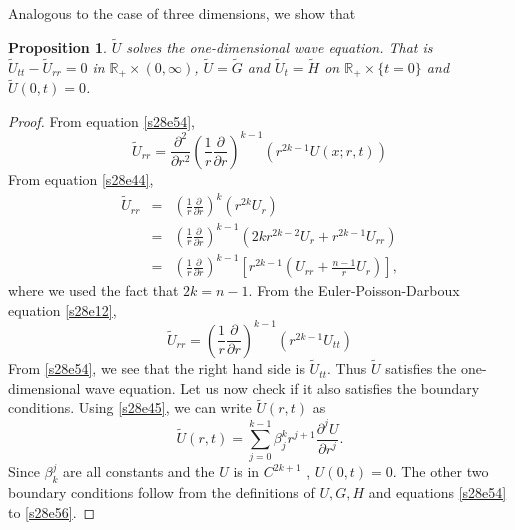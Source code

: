 \documentclass{article}
\theoremstyle{plain}
\numberwithin{thm}{section}
\theoremstyle{plain}
\newtheorem{prop}{Proposition}
\numberwithin{prop}{section}
\theoremstyle{definition}
\numberwithin{defn}{section}
\theoremstyle{remark}
\numberwithin{equation}{section}
\begin{document}
Analogous to the case of three dimensions, we show that
\begin{prop}\label{s28p3}
$\tilde{U}$ solves the one-dimensional wave equation. That is $\tilde{U}_{tt} - \tilde{U}_{rr} = 0$ in 
$\mathbb{R}_+ \times (0, \infty)$, $\tilde{U} = \tilde{G}$ and $\tilde{U}_t = \tilde{H}$ on $\mathbb{R}_+ \times
\{t = 0\}$ and $\tilde{U}(0, t) = 0$.
\end{prop}
\begin{proof}
From equation \eqref{s28e54},
\[
\tilde{U}_{rr} = 
\frac{\partial^2}{\partial r^2}\left(\frac{1}{r}\frac{\partial}{\partial r}\right)^{k-1}(r^{2k-1}U(x; r,t))
\]
From equation \eqref{s28e44},
\begin{eqnarray*}
\tilde{U}_{rr} &=& \left(\frac{1}{r}\frac{\partial}{\partial r}\right)^k\left(r^{2k}U_r\right) \\
 &=& \left(\frac{1}{r}\frac{\partial}{\partial r}\right)^{k-1}\left(2kr^{2k-2}U_r + r^{2k-1}U_{rr}\right) \\
 &=& \left(\frac{1}{r}\frac{\partial}{\partial r}\right)^{k-1}\left[r^{2k-1}\left(U_{rr} + 
 \frac{n-1}{r}U_r\right)\right],
\end{eqnarray*}
where we used the fact that $2k = n - 1$. From the Euler-Poisson-Darboux equation \eqref{s28e12}, 
\[
\tilde{U}_{rr} = \left(\frac{1}{r}\frac{\partial}{\partial r}\right)^{k-1}(r^{2k-1}U_{tt})
\]
From \eqref{s28e54}, we see that the right hand side is $\tilde{U}_{tt}$. Thus $\tilde{U}$ satisfies the one-
dimensional wave equation. Let us now check if it also satisfies the boundary conditions. Using \eqref{s28e45},
we can write $\tilde{U}(r,t)$ as
\begin{equation}\label{s28e59}
\tilde{U}(r,t) = \sum_{j=0}^{k-1}\beta^k_j r^{j+1}\frac{\partial^j U}{\partial r^j}.
\end{equation}
Since $\beta_k^j$ are all constants and the $U$ is in $C^{2k+1}$ , $U(0, t) = 0$. The other two boundary conditions
follow from the definitions of $U, G, H$ and equations \eqref{s28e54} to \eqref{s28e56}.
\end{proof}
\end{document}
